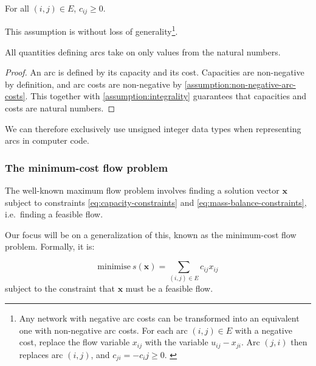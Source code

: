 \begin{assumption} \label{assumption:non-negative-arc-costs}
For all $(i,j) \in E$, $c_{ij} \geq 0$. \\
\end{assumption}

\begin{remark} 
This assumption is without loss of generality\footnote{Any network with negative arc costs can be transformed into an equivalent one with non-negative arc costs. For each arc $(i,j) \in E$ with a negative cost, replace the flow variable $x_{ij}$ with the variable $u_{ij} - x_{ji}$. Arc $(j,i)$ then replaces arc $(i,j)$, and $c_{ji} = -c_ij \geq 0$. \cite[p.~48]{Ahuja:1993}}. \\
\end{remark}

\begin{cor}All quantities defining arcs take on only values from the natural numbers.\footnotemark {}
\end{cor}
\begin{proof}
An arc is defined by its capacity and its cost. Capacities are non-negative by definition, and arc costs are non-negative by \cref{assumption:non-negative-arc-costs}. This together with \cref{assumption:integrality} guarantees that capacities and costs are natural numbers.
\end{proof}

\begin{remark}  
We can therefore exclusively use unsigned integer data types when representing arcs in computer code.
\end{remark}

\subsubsection{The minimum-cost flow problem} \label{sec:prep-flow-mcf}

The well-known maximum flow problem involves finding a solution vector
$\mathbf{x}$ subject to constraints \cref{eq:capacity-constraints} and \cref{eq:mass-balance-constraints}, i.e.\ finding a feasible flow.

Our focus will be on a generalization of this, known as the minimum-cost flow problem. Formally, it is:

\begin{equation} \label{eq:mcf-primal-problem}
\mbox{minimise}\ s(\mathbf{x})=\sum_{(i,j)\in E}c_{ij}x_{ij}
\end{equation}
subject to the constraint that $\mathbf{x}$ must be a feasible flow.

